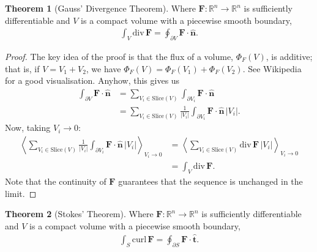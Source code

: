 \documentclass{article}
\theoremstyle{definition}
\newtheorem{thm}{Theorem}[subsubsection]
\begin{document}
\begin{thm}[Gauss' Divergence Theorem]
	Where $\mathbf{F}:\mathbb{R}^n\rightarrow\mathbb{R}^n$ is sufficiently differentiable and $V$ is a compact volume with a piecewise smooth boundary,
	\begin{align*}
		\int_V\text{div}\,\mathbf{F}=\oint_{\partial V}\mathbf{F}\cdot\hat{\mathbf{n}}.
	\end{align*}
\end{thm}
\begin{proof}
	The key idea of the proof is that the flux of a volume, $\Phi_F(V)$, is additive; that is, if $V=V_1+V_2$, we have $\Phi_F(V)=\Phi_F(V_1)+\Phi_F(V_2)$. See Wikipedia for a good visualisation.
	Anyhow, this gives us
	\begin{align*}
		\int_{\partial V}\mathbf{F}\cdot\hat{\mathbf{n}}&=\sum_{V_i\in\text{Slice}(V)}\int_{\partial V_i}\mathbf{F}\cdot\hat{\mathbf{n}}\\
		&=\sum_{V_i\in\text{Slice}(V)}\frac{1}{\lvert V_i\rvert}\int_{\partial V_i}\mathbf{F}\cdot\hat{\mathbf{n}}\,\lvert V_i\rvert.
	\end{align*}
	Now, taking $V_i\rightarrow0$:
	\begin{align*}
		\left\langle\sum_{V_i\in\text{Slice}(V)}\frac{1}{\lvert V_i\rvert}\int_{\partial V_i}\mathbf{F}\cdot\hat{\mathbf{n}}\,\lvert V_i\rvert\right\rangle_{V_i\rightarrow0}&=\left\langle\sum_{V_i\in\text{Slice}(V)}\text{div}\,\mathbf{F}\,\lvert V_i\rvert\right\rangle_{V_i\rightarrow0}\\
		&=\int_V\text{div}\,\mathbf{F}.
	\end{align*}
	Note that the continuity of $\mathbf{F}$ guarantees that the sequence is unchanged in the limit.
\end{proof}
\begin{thm}[Stokes' Theorem]
	Where $\mathbf{F}:\mathbb{R}^n\rightarrow\mathbb{R}^n$ is sufficiently differentiable and $V$ is a compact volume with a piecewise smooth boundary,
	\begin{align*}
		\int_S\text{curl}\,\mathbf{F}=\oint_{\partial S}\mathbf{F}\cdot\hat{\mathbf{t}}.
	\end{align*}
\end{thm}
\end{document}
